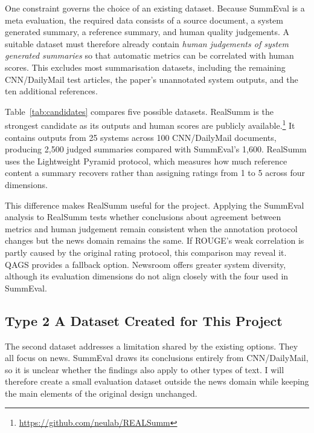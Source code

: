 \documentclass[11pt]{article}
\begin{document}
One constraint governs the choice of an existing dataset. Because SummEval is a meta evaluation, the required data consists of a source document, a system generated summary, a reference summary, and human quality judgements. A suitable dataset must therefore already contain \emph{human judgements of system generated summaries} so that automatic metrics can be correlated with human scores. This excludes most summarisation datasets, including the remaining CNN/DailyMail test articles, the paper's unannotated system outputs, and the ten additional references.

Table~\ref{tab:candidates} compares five possible datasets. RealSumm \citep{bhandari-etal-2020-reevaluating} is the strongest candidate as its outputs and human scores are publicly available.\footnote{\url{https://github.com/neulab/REALSumm}} It contains outputs from 25 systems across 100 CNN/DailyMail documents, producing 2{,}500 judged summaries compared with SummEval's 1{,}600. RealSumm uses the Lightweight Pyramid protocol, which measures how much reference content a summary recovers rather than assigning ratings from 1 to 5 across four dimensions.

This difference makes RealSumm useful for the project. Applying the SummEval analysis to RealSumm tests whether conclusions about agreement between metrics and human judgement remain consistent when the annotation protocol changes but the news domain remains the same. If ROUGE's weak correlation is partly caused by the original rating protocol, this comparison may reveal it. QAGS \citep{wang-etal-2020-asking} provides a fallback option. Newsroom \citep{grusky-etal-2018-newsroom} offers greater system diversity, although its evaluation dimensions do not align closely with the four used in SummEval.

\subsection{Type 2 A Dataset Created for This Project}
\label{sec:newdata-created}

The second dataset addresses a limitation shared by the existing options. They all focus on news. SummEval draws its conclusions entirely from CNN/DailyMail, so it is unclear whether the findings also apply to other types of text. I will therefore create a small evaluation dataset outside the news domain while keeping the main elements of the original design unchanged.
\end{document}
